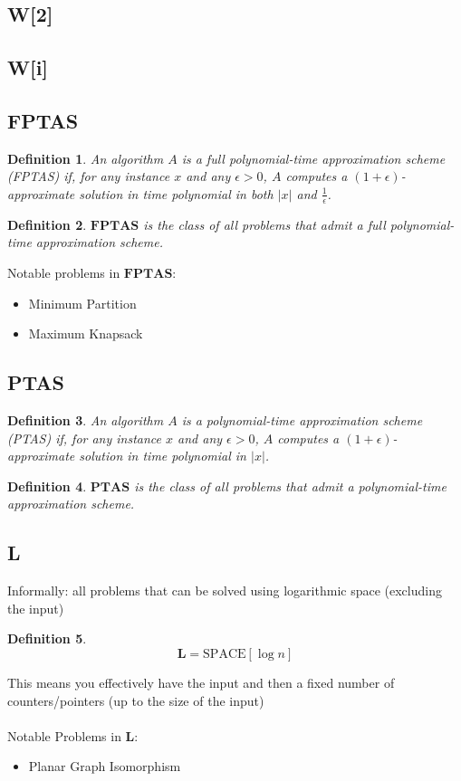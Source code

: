 \documentclass[]{article}
\theoremstyle{break}
\theoremstyle{break}
\newtheorem{definition}{Definition}[section]
\begin{document}
\subsection{W[2]}
\subsection{W[i]}
\label{sec:W}
\subsection{FPTAS} \label{sec:FPTAS}

\begin{definition}
	An algorithm $A$ is a full polynomial-time approximation scheme (FPTAS) if, for any instance $x$ and any $\epsilon > 0$, $A$ computes a $(1 + \epsilon)$-approximate solution in time polynomial in both $|x|$ and $\frac{1}{\epsilon}$.
\end{definition}

\begin{definition}
	$\mathbf{FPTAS}$ is the class of all problems that admit a full polynomial-time approximation scheme.
\end{definition}
$ $
\\
Notable problems in $\mathbf{FPTAS}$:
\begin{itemize}
	\item Minimum Partition
	\item Maximum Knapsack
\end{itemize}

\subsection{PTAS}

\begin{definition}
	An algorithm $A$ is a polynomial-time approximation scheme (PTAS) if, for any instance $x$ and any $\epsilon > 0$, $A$ computes a $(1 + \epsilon)$-approximate solution in time polynomial in $|x|$.
\end{definition}

\begin{definition}
	$\mathbf{PTAS}$ is the class of all problems that admit a polynomial-time approximation scheme.
\end{definition}

\subsection{L}
\label{sec:L}
Informally: all problems that can be solved using logarithmic space (excluding the input)
\\
\begin{definition}
	$$\mathbf{L} = \hyperref[sec:SPACE]{\text{SPACE}[\log n]}$$
\end{definition}
$ $
\\
This means you effectively have the input and then a fixed number of counters/pointers (up to the size of the input)
\\
\\
Notable Problems in $\mathbf{L}$:
\begin{itemize}
	\item Planar Graph Isomorphism
\end{itemize}
\end{document}
